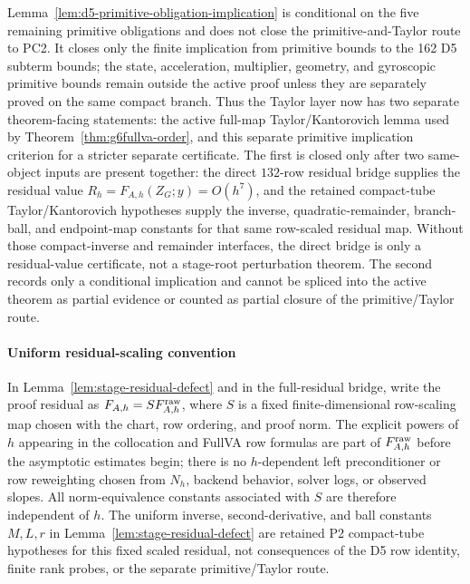 \documentclass[preprint,12pt]{elsarticle}
\begin{document}
Lemma~\ref{lem:d5-primitive-obligation-implication} is conditional on the five
remaining primitive obligations and does not close the primitive-and-Taylor
route to PC2.  It closes only the finite implication from primitive bounds to the
162 D5 subterm bounds; the state, acceleration, multiplier, geometry, and
gyroscopic primitive bounds remain outside the active proof unless they are
separately proved on the same compact branch.
Thus the Taylor layer now has two separate theorem-facing statements: the
active full-map Taylor/Kantorovich lemma used by
Theorem~\ref{thm:g6fullva-order}, and this separate primitive implication
criterion for a stricter separate certificate.  The first is closed only after
two same-object inputs are present together: the direct \(132\)-row residual
bridge supplies the residual value \(R_h=F_{A,h}(Z_G;y)=O(h^7)\), and the
retained compact-tube Taylor/Kantorovich hypotheses supply the inverse,
quadratic-remainder, branch-ball, and endpoint-map constants for that same
row-scaled residual map.  Without those compact-inverse and remainder
interfaces, the direct bridge is only a residual-value certificate, not a
stage-root perturbation theorem.  The second records only a conditional
implication and cannot be spliced into the active theorem as partial evidence
or counted as partial closure of the primitive/Taylor route.

\paragraph{Uniform residual-scaling convention}
In Lemma~\ref{lem:stage-residual-defect} and in the full-residual bridge,
write the proof residual as \(F_{A,h}=S F^{\rm raw}_{A,h}\), where \(S\) is
a fixed finite-dimensional row-scaling map chosen with the chart, row
ordering, and proof norm.  The explicit powers of \(h\) appearing in the
collocation and FullVA row formulas are part of \(F^{\rm raw}_{A,h}\) before
the asymptotic estimates begin; there is no \(h\)-dependent left
preconditioner or row reweighting chosen from \(N_h\), backend behavior,
solver logs, or observed slopes.  All norm-equivalence constants associated
with \(S\) are therefore independent of \(h\).  The uniform inverse,
second-derivative, and ball constants \(M,L,r\) in
Lemma~\ref{lem:stage-residual-defect} are retained P2 compact-tube hypotheses
for this fixed scaled residual, not consequences of the D5 row identity,
finite rank probes, or the separate primitive/Taylor route.
\end{document}
